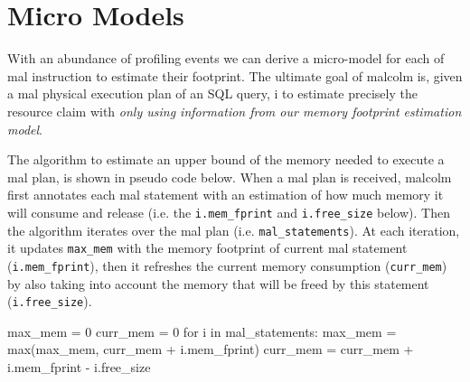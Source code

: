 \documentclass[conference]{IEEEtran}
\begin{document}


\section{Micro Models}
\label{sec:malcolm} 
With an abundance of profiling events we can derive a micro-model for each of {\sc mal} instruction
to estimate their footprint.
The ultimate goal of {\sc malcolm} is, given a {\sc mal} physical execution plan of an SQL query,
i%
to estimate precisely the resource claim with \textit{only using information from our memory footprint estimation model}.

The algorithm to estimate an upper bound of the memory needed to execute a {\sc mal} plan, is shown in pseudo code below.
When a {\sc mal} plan is received, {\sc malcolm} first annotates each {\sc mal} statement with an estimation of how much memory it will consume and release (i.e. the \texttt{\small i.mem\_fprint} and \texttt{\small i.free\_size} below).
Then the algorithm iterates over the {\sc mal} plan (i.e. \texttt{\small mal\_statements}).
At each iteration, it updates \texttt{\small max\_mem} with the memory footprint of current {\sc mal} statement (\texttt{\small i.mem\_fprint}), then it refreshes the current memory consumption (\texttt{\small curr\_mem}) by also taking into account the memory that will be freed by this statement (\texttt{\small i.free\_size}). 
\begin{verb}
max_mem  = 0
curr_mem = 0 
for i in mal_statements:
  max_mem = max(max_mem, curr_mem + i.mem_fprint)
  curr_mem = curr_mem + i.mem_fprint - i.free_size
\end{verb}
\end{document}
